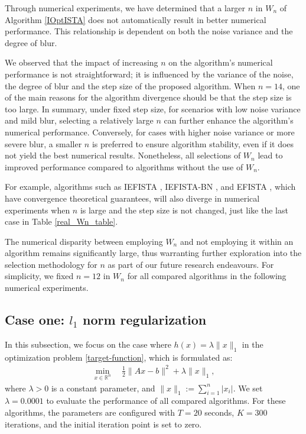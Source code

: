 \documentclass{article}
\begin{document}
Through numerical experiments, we have determined that a larger $n$ in $W_n$ of Algorithm \ref{IOptISTA} does not automatically result in better numerical performance. This relationship is dependent on both the noise variance and the degree of blur.

We observed that the impact of increasing $n$ on the algorithm's numerical performance is not straightforward; it is influenced by the variance of the noise, the degree of blur and the step size of the proposed algorithm. When $n=14$, one of the main reasons for the algorithm divergence should be that the step size is too large. In summary, under fixed step size, for scenarios with low noise variance and mild blur, selecting a relatively large $n$ can further enhance the algorithm's numerical performance. Conversely, for cases with higher noise variance or more severe blur, a smaller $n$ is preferred to ensure algorithm stability, even if it does not yield the best numerical results. Nonetheless, all selections of $W_{n}$ lead to improved performance compared to algorithms without the use of $W_n$. 

For example, algorithms such as IEFISTA \cite{BhottoAS15}, IEFISTA-BN \cite{WangWWGC18}, and EFISTA \cite{KumarS24}, which have convergence theoretical guarantees, will also diverge in numerical experiments when $n$ is large and the step size is not changed, just like the last case in Table \ref{real_Wn_table}.

The numerical disparity between employing $W_n$ and not employing it within an algorithm remains significantly large, thus warranting further exploration into the selection methodology for $n$ as part of our future research endeavours. For simplicity, we fixed $n=12$ in $W_{n}$ for all compared algorithms in the following numerical experiments.

\subsection{Case one: \texorpdfstring{$l_{1}$}{l1} norm regularization} \label{l1-regularization}
In this subsection, we focus on the case where $h(x) = \lambda \|x\|_1$ \cite{Tibshirani96,Lu17c} in the optimization problem \eqref{target-function}, which is formulated as:
\begin{eqnarray}
	\min_{x \in \mathbb{R}^n} \quad \frac{1}{2} \|Ax - b\|^2 + \lambda \|x\|_1, \label{l1-model}
\end{eqnarray}
where $\lambda > 0$ is a constant parameter, and $\|x\|_1 := \sum_{i=1}^{n} |x_i|$. We set $\lambda = 0.0001$ to evaluate the performance of all compared algorithms. For these algorithms, the parameters are configured with $T = 20$ seconds, $K = 300$ iterations, and the initial iteration point is set to zero.
\end{document}
